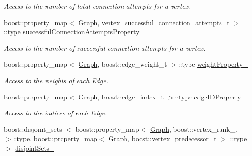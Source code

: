 \begin{DoxyCompactItemize}
\begin{DoxyCompactList}\small\item\em \-Access to the number of total connection attempts for a vertex. \end{DoxyCompactList}\item 
\hypertarget{class_f_i_r_m_ad9d31e5b2a0bf5921fb1c8f43e55338b}{boost\-::property\-\_\-map$<$ \hyperlink{class_f_i_r_m_a687e9f4243b22c30ee1fa5da22a85053}{\-Graph}, \*
\hyperlink{struct_f_i_r_m_1_1vertex__successful__connection__attempts__t}{vertex\-\_\-successful\-\_\-connection\-\_\-attempts\-\_\-t} $>$\*
\-::type \hyperlink{class_f_i_r_m_ad9d31e5b2a0bf5921fb1c8f43e55338b}{successful\-Connection\-Attempts\-Property\-\_\-}}\label{class_f_i_r_m_ad9d31e5b2a0bf5921fb1c8f43e55338b}

\begin{DoxyCompactList}\small\item\em \-Access to the number of successful connection attempts for a vertex. \end{DoxyCompactList}\item 
\hypertarget{class_f_i_r_m_aebe2eb302b9af9ced9bc26f03d369297}{boost\-::property\-\_\-map$<$ \hyperlink{class_f_i_r_m_a687e9f4243b22c30ee1fa5da22a85053}{\-Graph}, \*
boost\-::edge\-\_\-weight\-\_\-t $>$\-::type \hyperlink{class_f_i_r_m_aebe2eb302b9af9ced9bc26f03d369297}{weight\-Property\-\_\-}}\label{class_f_i_r_m_aebe2eb302b9af9ced9bc26f03d369297}

\begin{DoxyCompactList}\small\item\em \-Access to the weights of each \-Edge. \end{DoxyCompactList}\item 
\hypertarget{class_f_i_r_m_a81eba4eb39bce397127a9d41cf0b5cd2}{boost\-::property\-\_\-map$<$ \hyperlink{class_f_i_r_m_a687e9f4243b22c30ee1fa5da22a85053}{\-Graph}, \*
boost\-::edge\-\_\-index\-\_\-t $>$\-::type \hyperlink{class_f_i_r_m_a81eba4eb39bce397127a9d41cf0b5cd2}{edge\-I\-D\-Property\-\_\-}}\label{class_f_i_r_m_a81eba4eb39bce397127a9d41cf0b5cd2}

\begin{DoxyCompactList}\small\item\em \-Access to the indices of each \-Edge. \end{DoxyCompactList}\item 
\hypertarget{class_f_i_r_m_adbe52d3e291fc164ff9338765534e7ce}{boost\-::disjoint\-\_\-sets\*
$<$ boost\-::property\-\_\-map$<$ \hyperlink{class_f_i_r_m_a687e9f4243b22c30ee1fa5da22a85053}{\-Graph}, \*
boost\-::vertex\-\_\-rank\-\_\-t $>$\-::type, \*
boost\-::property\-\_\-map$<$ \hyperlink{class_f_i_r_m_a687e9f4243b22c30ee1fa5da22a85053}{\-Graph}, \*
boost\-::vertex\-\_\-predecessor\-\_\-t $>$\*
\-::type $>$ \hyperlink{class_f_i_r_m_adbe52d3e291fc164ff9338765534e7ce}{disjoint\-Sets\-\_\-}}\label{class_f_i_r_m_adbe52d3e291fc164ff9338765534e7ce}


\end{DoxyCompactItemize}
